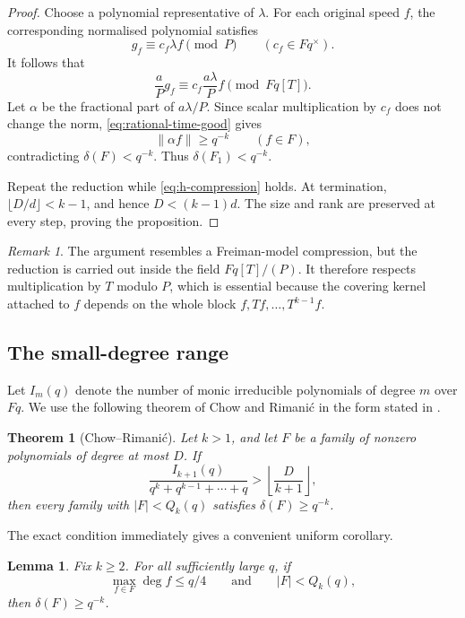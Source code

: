 \documentclass[11pt,reqno]{amsart}
\numberwithin{equation}{section}
\newtheorem{theorem}{Theorem}[section]
\newtheorem{lemma}[lemma]{Lemma}
\theoremstyle{definition}
\theoremstyle{remark}
\newtheorem{remark}[remark]{Remark}
\newcommand{\Fq}{\mathbb F_q}
\newcommand{\cF}{\mathcal F}
\newcommand{\abs}[1]{\lvert#1\rvert}
\newcommand{\norm}[1]{\lVert#1\rVert}
\def\Fq{Fq}%
\def\mathbb#1{#1}%
\def\mathcal#1{#1}%
\begin{document}
\begin{proof}
Choose a polynomial representative of $\lambda$.  For each original speed $f$, the corresponding normalised polynomial satisfies
\[
 g_f\equiv c_f\lambda f\pmod P
 \qquad(c_f\in\Fq^\times).
\]
It follows that
\[
 \frac aP g_f
 \equiv
 c_f\frac{a\lambda}{P}f
 \pmod{\Fq[T]}.
\]
Let $\alpha$ be the fractional part of $a\lambda/P$.  Since scalar multiplication by $c_f$ does not change the norm, \eqref{eq:rational-time-good} gives
\[
 \norm{\alpha f}\ge q^{-k}
 \qquad(f\in\cF),
\]
contradicting $\delta(\cF)<q^{-k}$.  Thus
$\delta(\cF_1)<q^{-k}$.

Repeat the reduction while \eqref{eq:h-compression} holds.  At termination,
$\lfloor D/d\rfloor<k-1$, and hence $D<(k-1)d$.  The size and rank are preserved at every step, proving the proposition.
\end{proof}

\begin{remark}
The argument resembles a Freiman-model compression, but the reduction is carried out inside the field
$\Fq[T]/(P)$.  It therefore respects multiplication by $T$ modulo $P$, which is essential because the covering kernel attached to $f$ depends on the whole block
$f,Tf,\ldots,T^{k-1}f$.
\end{remark}

\subsection{The small-degree range}

Let $I_m(q)$ denote the number of monic irreducible polynomials of degree $m$ over $\Fq$.  We use the following theorem of Chow and Rimani\'c in the form stated in
\cite[Theorem~1.6]{ChowRimanic}.

\begin{theorem}[Chow--Rimani\'c]\label{thm:CR-small-degree}
Let $k>1$, and let $\cF$ be a family of nonzero polynomials of degree at most $D$.  If
\begin{equation}\label{eq:CR-small-degree-condition}
 \frac{I_{k+1}(q)}{q^k+q^{k-1}+\cdots+q}
 >\left\lfloor\frac D{k+1}\right\rfloor,
\end{equation}
then every family with $\abs{\cF}<Q_k(q)$ satisfies
$\delta(\cF)\ge q^{-k}$.
\end{theorem}

The exact condition immediately gives a convenient uniform corollary.

\begin{lemma}\label{lem:small-degree-cor}
Fix $k\ge2$.  For all sufficiently large $q$, if
\begin{equation}\label{eq:q-fourth-degree}
 \max_{f\in\cF}\deg f\le q/4
 \qquad\text{and}\qquad
 \abs{\cF}<Q_k(q),
\end{equation}
then $\delta(\cF)\ge q^{-k}$.
\end{lemma}
\end{document}
